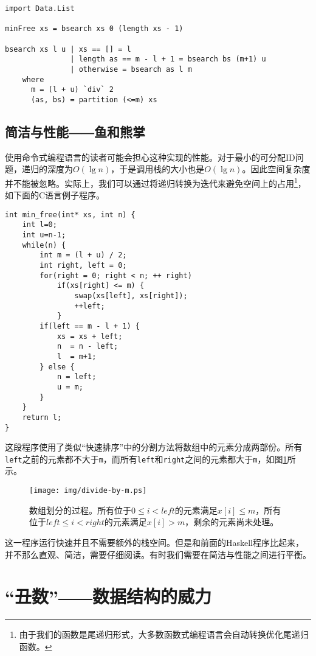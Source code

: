 \documentclass{article}
\begin{document}
\begin{lstlisting}[style=Haskell]
import Data.List

minFree xs = bsearch xs 0 (length xs - 1)

bsearch xs l u | xs == [] = l
               | length as == m - l + 1 = bsearch bs (m+1) u
               | otherwise = bsearch as l m
    where
      m = (l + u) `div` 2
      (as, bs) = partition (<=m) xs
\end{lstlisting}
\lstset{}

\subsection{简洁与性能――鱼和熊掌}
使用命令式编程语言的读者可能会担心这种实现的性能。对于最小的可分配ID问题，递归的深度为$O(\lg n)$，于是调用栈的大小也是$O(\lg n)$。因此空间复杂度并不能被忽略。实际上，我们可以通过将递归转换为迭代来避免空间上的占用\footnote{由于我们的函数是尾递归形式，大多数函数式编程语言会自动转换优化尾递归函数。}，如下面的C语言例子程序。

\lstset{language=C}
\begin{lstlisting}
int min_free(int* xs, int n) {
    int l=0;
    int u=n-1;
    while(n) {
        int m = (l + u) / 2;
        int right, left = 0;
        for(right = 0; right < n; ++ right)
            if(xs[right] <= m) {
                swap(xs[left], xs[right]);
                ++left;
            }
        if(left == m - l + 1) {
            xs = xs + left;
            n  = n - left;
            l  = m+1;
        } else {
            n = left;
            u = m;
        }
    }
    return l;
}
\end{lstlisting}

这段程序使用了类似“快速排序”中的分割方法将数组中的元素分成两部份。所有\texttt{left}之前的元素都不大于\texttt{m}，而所有\texttt{left}和\texttt{right}之间的元素都大于\texttt{m}，如图\ref{fig:divide}所示。

\begin{figure}[htbp]
  \centering
  \texttt{[image: img/divide-by-m.ps]}
  \caption{数组划分的过程。所有位于$0 \leq i < left$的元素满足$x[i] \leq m$，所有位于$left \leq i < right$的元素满足$x[i] > m$，剩余的元素尚未处理。} \label{fig:divide}
\end{figure}

这一程序运行快速并且不需要额外的栈空间。但是和前面的Haskell程序比起来，并不那么直观、简洁，需要仔细阅读。有时我们需要在简洁与性能之间进行平衡。

\section{“丑数”――数据结构的威力}
\end{document}
